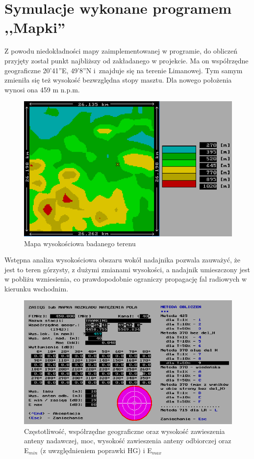 \documentclass[12pt, a4paper, oneside]{article}
\begin{document}
\section{Symulacje wykonane programem ,,Mapki''}
\indent\indent Z powodu niedokładności mapy zaimplementowanej w programie, do obliczeń przyjęty został punkt najbliższy od zakładanego w projekcie. Ma on współrzędne geograficzne 20’41”E, 49’8”N i~znajduje się na terenie Limanowej. Tym samym zmieniła się też wysokość bezwzględna stopy masztu. Dla nowego położenia wynosi ona 459 m n.p.m.
\begin{figure}[h!]
\centering
\includegraphics[scale=0.85]{pics/mapki/f11.png}
\caption{Mapa wysokościowa badanego terenu}
\end{figure}\newline
\indent Wstępna analiza wysokościowa obszaru wokół nadajnika pozwala zauważyć, że jest to teren górzysty, z dużymi zmianami wysokości, a nadajnik umieszczony jest w pobliżu wzniesienia, co prawdopodobnie ograniczy propagację fal radiowych w kierunku wschodnim.
\begin{figure}[h!]
\centering
\includegraphics[scale=0.85]{pics/mapki/f1.png}
\caption{Częstotliwość, współrzędne geograficzne oraz wysokość zawieszenia anteny nadawczej, moc, wysokość zawieszenia anteny odbiorczej oraz E$_{min}$ (z uwzględnieniem poprawki HG) i E$_{max}$}
\end{figure}
\clearpage
\end{document}
